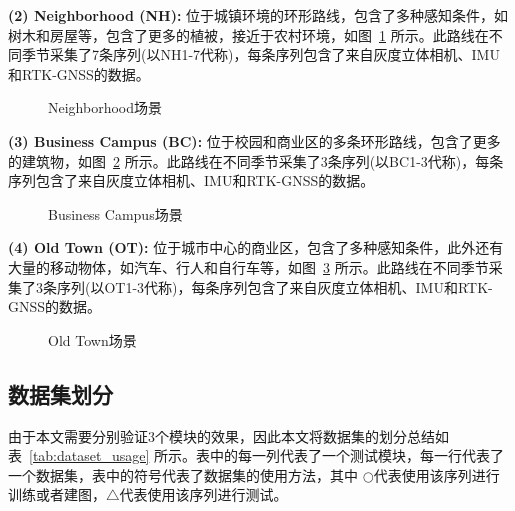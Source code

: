 \textbf{(2) Neighborhood (NH):} 位于城镇环境的环形路线，包含了多种感知条件，如树木和房屋等，包含了更多的植被，接近于农村环境，如图~\ref{fig:NH_data} 所示。此路线在不同季节采集了7条序列(以NH1-7代称)，每条序列包含了来自灰度立体相机、IMU和RTK-GNSS的数据。

\begin{figure}
  \centering
  \caption{Neighborhood场景}
  \label{fig:NH_data}
\end{figure}

\textbf{(3) Business Campus (BC):} 位于校园和商业区的多条环形路线，包含了更多的建筑物，如图~\ref{fig:BC_data} 所示。此路线在不同季节采集了3条序列(以BC1-3代称)，每条序列包含了来自灰度立体相机、IMU和RTK-GNSS的数据。

\begin{figure}
  \centering
  \caption{Business Campus场景}
  \label{fig:BC_data}
\end{figure}

\textbf{(4) Old Town (OT):} 位于城市中心的商业区，包含了多种感知条件，此外还有大量的移动物体，如汽车、行人和自行车等，如图~\ref{fig:OT_data} 所示。此路线在不同季节采集了3条序列(以OT1-3代称)，每条序列包含了来自灰度立体相机、IMU和RTK-GNSS的数据。

\begin{figure}
  \centering
  \caption{Old Town场景}
  \label{fig:OT_data}
\end{figure}

\subsection{数据集划分}

由于本文需要分别验证3个模块的效果，因此本文将数据集的划分总结如表~\ref{tab:dataset_usage} 所示。表中的每一列代表了一个测试模块，每一行代表了一个数据集，表中的符号代表了数据集的使用方法，其中{\color[HTML]{3166FF} $\bigcirc$}代表使用该序列进行训练或者建图，{\color[HTML]{FD6864}$\bigtriangleup$}代表使用该序列进行测试。

